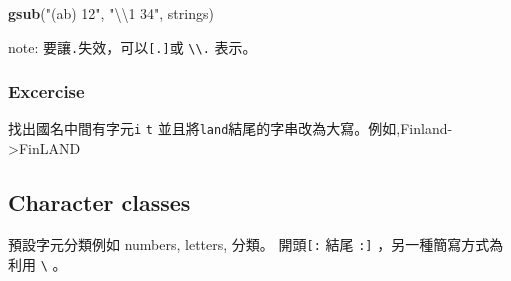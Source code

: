 \documentclass[]{book}
\newenvironment{Shaded}{\begin{snugshade}}{\end{snugshade}}
\newcommand{\KeywordTok}[1]{\textcolor[rgb]{0.13,0.29,0.53}{\textbf{#1}}}
\newcommand{\CharTok}[1]{\textcolor[rgb]{0.31,0.60,0.02}{#1}}
\newcommand{\StringTok}[1]{\textcolor[rgb]{0.31,0.60,0.02}{#1}}
\newcommand{\NormalTok}[1]{#1}
\theoremstyle{definition}
\theoremstyle{definition}
\theoremstyle{definition}
\theoremstyle{remark}
\begin{document}
\begin{Shaded}
\begin{Highlighting}[]
\KeywordTok{gsub}\NormalTok{(}\StringTok{"(ab) 12"}\NormalTok{, }\StringTok{"}\CharTok{\textbackslash{}\textbackslash{}}\StringTok{1 34"}\NormalTok{, strings) }
\end{Highlighting}
\end{Shaded}

note: 要讓\texttt{.}失效，可以\texttt{{[}.{]}}或
\texttt{\textbackslash{}\textbackslash{}.} 表示。

\subsubsection{Excercise}\label{excercise}

找出國名中間有字元\texttt{i} \texttt{t}
並且將\texttt{land}結尾的字串改為大寫。例如,Finland-\textgreater{}FinLAND

\subsection{Character classes}\label{character-classes}

預設字元分類例如 numbers, letters, 分類。 開頭\texttt{{[}:} 結尾
\texttt{:{]}} ，另一種簡寫方式為利用 \texttt{\textbackslash{}} 。
\end{document}
